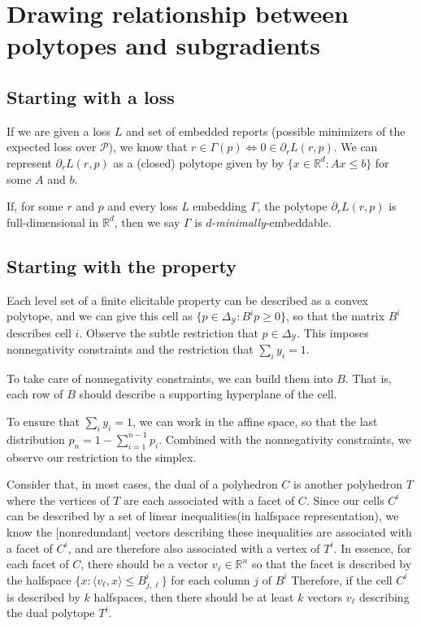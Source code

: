 \documentclass[12pt]{article}
\newcommand{\reals}{\mathbb{R}}
\renewcommand{\P}{\mathcal{P}}
\newcommand{\Y}{\mathcal{Y}}
\newcommand{\inprod}[2]{\langle #1, #2 \rangle}
\newcommand{\simplex}{\Delta_\Y}
\begin{document}
\section{Drawing relationship between polytopes and subgradients}
\subsection{Starting with a loss}
If we are given a loss $L$ and set of embedded reports (possible minimizers of the expected loss over $\P$), we know that $r \in \Gamma(p) \iff 0 \in \partial_r L(r, p)$.
We can represent $\partial_r L(r,p)$ as a (closed) polytope given by by $\{x \in \reals^d : Ax \leq b \}$ for some $A$ and $b$.
 
If, for some $r$ and $p$ and every loss $L$ embedding $\Gamma$, the polytope $\partial_r L(r,p)$ is full-dimensional in $\reals^d$, then we say $\Gamma$ is $d$-\emph{minimally}-embeddable.

\subsection{Starting with the property}
Each level set of a finite elicitable property can be described as a convex polytope, and we can give this cell as $\{p \in \simplex : B^ip \geq 0 \}$, so that the matrix $B^i$ describes cell $i$.
Observe the subtle restriction that $p \in \simplex$.
This imposes nonnegativity constraints and the restriction that $\sum_i y_i =1$.

To take care of nonnegativity constraints, we can build them into $B$.
That is, each row of $B$ should describe a supporting hyperplane of the cell.

To ensure that $\sum_i y_i = 1$, we can work in the affine space, so that the last distribution $p_n = 1 - \sum_{i=1}^{n-1} p_i$.
Combined with the nonnegativity constraints, we observe our restriction to the simplex.

Consider that, in most cases, the dual of a polyhedron $C$ is another polyhedron $T$ where the vertices of $T$ are each associated with a facet of $C$.
Since our cells $C^i$ can be described by a set of linear inequalities(in halfspace representation), we know the [nonredundant] vectors describing these inequalities are associated with a facet of $C^i$, and are therefore also associated with a vertex of $T^i$.
In essence, for each facet of $C$, there should be a vector $v_\ell \in \reals^n$ so that the facet is described by the halfspace $\{x : \inprod{v_\ell}{x} \leq B^i_{j,\ell} \}$ for each column $j$ of $B^i$ 
Therefore, if the cell $C^i$ is described by $k$ halfspaces, then there should be at least $k$ vectors $v_\ell$ describing the dual polytope $T^i$.
\end{document}
